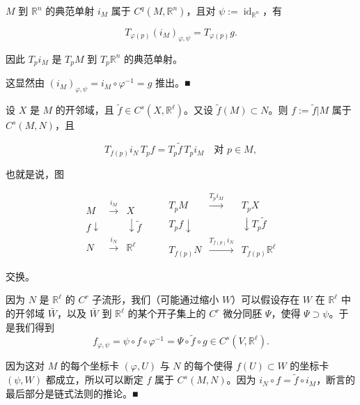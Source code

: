 \begin{example}

\begin{items}
\item

$ M $ 到 $ \mathbb{R}^{n} $ 的典范单射 $ i_{M} $ 属于 $ C^{q}(M,\mathbb{R}^{n}) $，且对 $ \psi := \operatorname{id}_{\mathbb{R}^{n}} $，有

\[
T_{\varphi(p)}(i_{M})_{\varphi,\psi} = T_{\varphi(p)}g .
\]

因此 $ T_{p}i_{M} $ 是 $ T_{p}M $ 到 $ T_{p}\mathbb{R}^{n} $ 的典范单射。

\proofhead
这显然由 $ (i_{M})_{\varphi,\psi} = i_{M}\circ\varphi^{-1} = g $ 推出。\nobreak\hspace{0.35em}■
\item

设 $ X $ 是 $ M $ 的开邻域，且 $ \tilde{f} \in C^{s}(X,\mathbb{R}^{\ell}) $。又设 $ \tilde{f}(M) \subset N $。则 $ f := \tilde{f}|M $ 属于 $ C^{s}(M,N) $，且

\[
T_{f(p)}i_{N}\,T_{p}f = T_{p}\tilde{f}\,T_{p}i_{M} \quad \text{对 } p \in M ,
\]

也就是说，图

\begin{equation*}
\begin{array}{ccc} M & \xrightarrow{i_{M}} & X \\ f \downarrow & & \downarrow \tilde{f} \\ N & \xrightarrow{i_{N}} & \mathbb{R}^{\ell} \end{array} \qquad \begin{array}{ccc} T_{p}M & \xrightarrow{T_{p}i_{M}} & T_{p}X \\ T_{p}f \downarrow & & \downarrow T_{p}\tilde{f} \\ T_{f(p)}N & \xrightarrow{T_{f(p)}i_{N}} & T_{f(p)}\mathbb{R}^{\ell} \end{array}
\end{equation*}

交换。

\proofhead
因为 $ N $ 是 $ \mathbb{R}^{\ell} $ 的 $ C^{r} $ 子流形，我们（可能通过缩小 $ W $）可以假设存在 $ W $ 在 $ \mathbb{R}^{\ell} $ 中的开邻域 $ \bar{W} $，以及 $ \bar{W} $ 到 $ \mathbb{R}^{\ell} $ 的某个开子集上的 $ C^{r} $ 微分同胚 $ \Psi $，使得 $ \Psi \supset \psi $。于是我们得到
\[
f_{\varphi,\psi} = \psi\circ f\circ\varphi^{-1} = \Psi\circ\tilde{f}\circ g \in C^{s}(V,\mathbb{R}^{\ell}) .
\]

因为这对 $ M $ 的每个坐标卡 $ (\varphi,U) $ 与 $ N $ 的每个使得 $ f(U) \subset W $ 的坐标卡 $ (\psi,W) $ 都成立，所以可以断定 $ f $ 属于 $ C^{s}(M,N) $。因为 $ i_{N}\circ f = \tilde{f}\circ i_{M} $，断言的最后部分是链式法则的推论。\nobreak\hspace{0.35em}■


\end{items}
\end{example}

